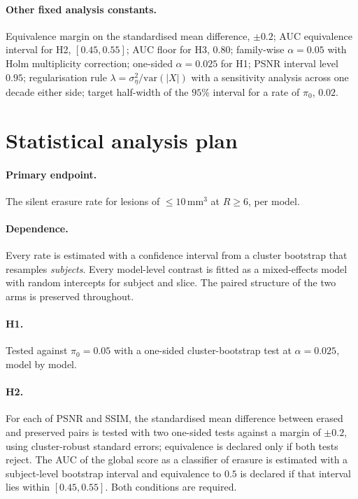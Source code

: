 \documentclass[11pt,a4paper]{article}
\begin{document}
\paragraph{Other fixed analysis constants.}
Equivalence margin on the standardised mean difference, $\pm 0.2$;
AUC equivalence interval for H2, $[0.45, 0.55]$;
AUC floor for H3, $0.80$;
family-wise $\alpha = 0.05$ with Holm multiplicity correction;
one-sided $\alpha = 0.025$ for H1;
PSNR interval level $0.95$;
regularisation rule $\lambda = \sigma_\eta^2 / \mathrm{var}(|X|)$ with a
sensitivity analysis across one decade either side;
target half-width of the $95\%$ interval for a rate of $\pi_0$, $0.02$.

\section{Statistical analysis plan}

\paragraph{Primary endpoint.} The silent erasure rate for lesions of
$\le 10\,\mathrm{mm}^3$ at $R \ge 6$, per model.

\paragraph{Dependence.} Every rate is estimated with a confidence interval
from a cluster bootstrap that resamples \emph{subjects}. Every model-level
contrast is fitted as a mixed-effects model with random intercepts for subject
and slice. The paired structure of the two arms is preserved throughout.

\paragraph{H1.} Tested against $\pi_0 = 0.05$ with a one-sided
cluster-bootstrap test at $\alpha = 0.025$, model by model.

\paragraph{H2.} For each of PSNR and SSIM, the standardised mean difference
between erased and preserved pairs is tested with two one-sided tests against
a margin of $\pm 0.2$, using cluster-robust standard errors; equivalence is
declared only if both tests reject. The AUC of the global score as a
classifier of erasure is estimated with a subject-level bootstrap interval and
equivalence to $0.5$ is declared if that interval lies within $[0.45, 0.55]$.
Both conditions are required.
\end{document}
